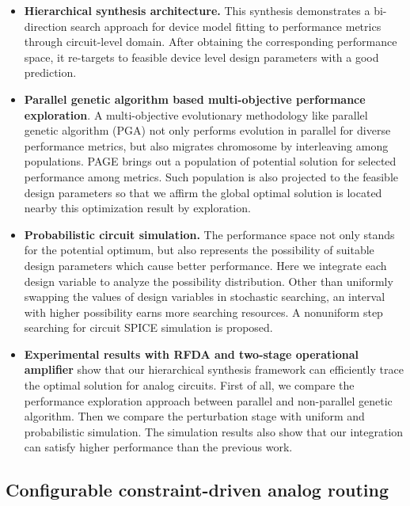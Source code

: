       \begin{itemize}
      \item {\bf Hierarchical synthesis architecture.} This synthesis demonstrates a bi-direction search approach for device model fitting to performance metrics through circuit-level domain. After obtaining the corresponding performance space, it re-targets to feasible device level design parameters with a good prediction.
      \item {\bf Parallel genetic algorithm based multi-objective performance exploration}. A multi-objective evolutionary methodology like parallel genetic algorithm (PGA) not only performs evolution in parallel for diverse performance metrics, but also migrates chromosome by interleaving among populations. PAGE brings out a population of potential solution for selected performance among metrics. Such population is also projected to the feasible design parameters so that we affirm the global optimal solution is located nearby this optimization result by exploration.
      \item {\bf Probabilistic circuit simulation.} The performance space not only stands for the potential optimum, but also represents the possibility of suitable design parameters which cause better performance. Here we integrate each design variable to analyze the possibility distribution. Other than uniformly swapping the values of design variables in stochastic searching, an interval with higher possibility earns more searching resources. A nonuniform step searching for circuit SPICE simulation is proposed.
      \item {\bf Experimental results with RFDA and two-stage operational amplifier} show that our hierarchical synthesis framework can efficiently trace the optimal solution for analog circuits. First of all, we compare the performance exploration approach between parallel and non-parallel genetic algorithm. Then we compare the perturbation stage with uniform and probabilistic simulation. The simulation results also show that our integration can satisfy higher performance than the previous work.
      \end{itemize}

    \subsection{Configurable constraint-driven analog routing}
    \label{subsec:CCDARContribute}

